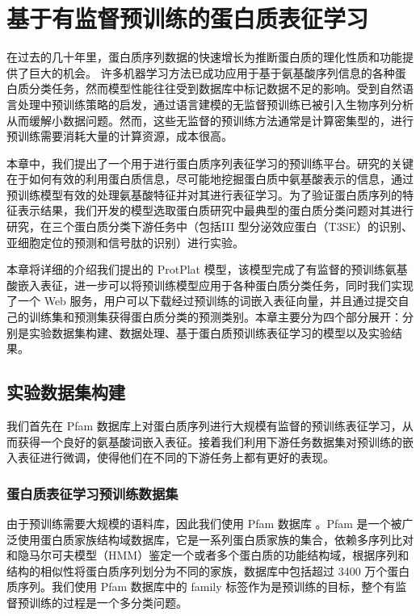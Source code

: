 
\chapter{基于有监督预训练的蛋白质表征学习}

在过去的几十年里，蛋白质序列数据的快速增长为推断蛋白质的理化性质和功能提供了巨大的机会。 许多机器学习方法已成功应用于基于氨基酸序列信息的各种蛋白质分类任务，然而模型性能往往受到数据库中标记数据不足的影响。受到自然语言处理中预训练策略的启发，通过语言建模的无监督预训练已被引入生物序列分析从而缓解小数据问题。然而，这些无监督的预训练方法通常是计算密集型的，进行预训练需要消耗大量的计算资源，成本很高。

本章中，我们提出了一个用于进行蛋白质序列表征学习的预训练平台。研究的关键在于如何有效的利用蛋白质信息，尽可能地挖掘蛋白质中氨基酸表示的信息，通过预训练模型有效的处理氨基酸特征并对其进行表征学习。为了验证蛋白质序列的特征表示结果，我们开发的模型选取蛋白质研究中最典型的蛋白质分类问题对其进行研究，在三个蛋白质分类下游任务中（包括III 型分泌效应蛋白（T3SE）的识别、亚细胞定位的预测和信号肽的识别）进行实验。

本章将详细的介绍我们提出的 ProtPlat 模型，该模型完成了有监督的预训练氨基酸嵌入表征，进一步可以将预训练模型应用于各种蛋白质分类任务，同时我们实现了一个 Web 服务，用户可以下载经过预训练的词嵌入表征向量，并且通过提交自己的训练集和预测集获得蛋白质分类的预测类别。本章主要分为四个部分展开：分别是实验数据集构建、数据处理、基于蛋白质预训练表征学习的模型以及实验结果。

\section{实验数据集构建}
我们首先在 Pfam 数据库上对蛋白质序列进行大规模有监督的预训练表征学习，从而获得一个良好的氨基酸词嵌入表征。接着我们利用下游任务数据集对预训练的嵌入表征进行微调，使得他们在不同的下游任务上都有更好的表现。

\subsection{蛋白质表征学习预训练数据集} \label{4.1.1}
由于预训练需要大规模的语料库，因此我们使用 Pfam 数据库 \cite{finn2010pfam}。Pfam 是一个被广泛使用蛋白质家族结构域数据库，它是一系列蛋白质家族的集合，依赖多序列比对和隐马尔可夫模型（HMM）鉴定一个或者多个蛋白质的功能结构域，根据序列和结构的相似性将蛋白质序列划分为不同的家族，数据库中包括超过 3400 万个蛋白质序列。我们使用 Pfam 数据库中的 family 标签作为是预训练的目标，整个有监督预训练的过程是一个多分类问题。

